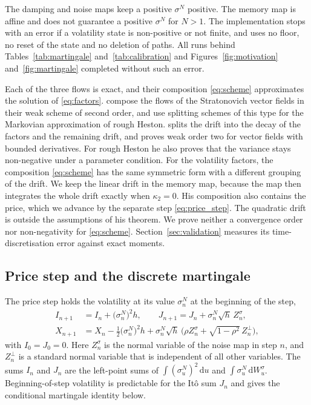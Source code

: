 \documentclass{rQUF2e}
\theoremstyle{plain}
\theoremstyle{definition}
\theoremstyle{remark}
\newcommand{\D}{\mathrm{d}}
\begin{document}
The damping and noise maps keep a positive $\sigma^N$ positive. The memory map is affine and does not guarantee a positive $\sigma^N$ for $N>1$. The implementation stops with an error if a volatility state is non-positive or not finite, and uses no floor, no reset of the state and no deletion of paths. All runs behind Tables~\ref{tab:martingale} and~\ref{tab:calibration} and Figures~\ref{fig:motivation} and~\ref{fig:martingale} completed without such an error.

Each of the three flows is exact, and their composition \eqref{eq:scheme} approximates the solution of \eqref{eq:factors}. \citet{NinomiyaVictoir2008} compose the flows of the Stratonovich vector fields in their weak scheme of second order, and \citet{BayerBreneis2024} use splitting schemes of this type for the Markovian approximation of rough Heston. \citet{Shinozaki2026} splits the drift into the decay of the factors and the remaining drift, and proves weak order two for vector fields with bounded derivatives. For rough Heston he also proves that the variance stays non-negative under a parameter condition. For the volatility factors, the composition \eqref{eq:scheme} has the same symmetric form with a different grouping of the drift. We keep the linear drift in the memory map, because the map then integrates the whole drift exactly when $\kappa_2=0$. His composition also contains the price, which we advance by the separate step \eqref{eq:price_step}. The quadratic drift is outside the assumptions of his theorem. We prove neither a convergence order nor non-negativity for \eqref{eq:scheme}. Section~\ref{sec:validation} measures its time-discretisation error against exact moments.

\subsection{Price step and the discrete martingale}\label{sec:price_step}

The price step holds the volatility at its value $\sigma^N_n$ at the beginning of the step,
\begin{equation}\label{eq:price_step}
\begin{split}
I_{n+1}&=I_n+\big(\sigma^N_n\big)^2h,\qquad J_{n+1}=J_n+\sigma^N_n\sqrt h\,Z^\sigma_n,\\
X_{n+1}&=X_n-\tfrac12\big(\sigma^N_n\big)^2h+\sigma^N_n\sqrt h\,\Big(\rho Z^\sigma_n+\sqrt{1-\rho^2}\,Z^\perp_n\Big),
\end{split}
\end{equation}
with $I_0=J_0=0$. Here $Z^\sigma_n$ is the normal variable of the noise map in step $n$, and $Z^\perp_n$ is a standard normal variable that is independent of all other variables. The sums $I_n$ and $J_n$ are the left-point sums of $\int(\sigma^N_u)^2\,\D u$ and $\int\sigma^N_u\,\D W^\sigma_u$. Beginning-of-step volatility is predictable for the It\^o sum $J_n$ and gives the conditional martingale identity below.
\end{document}
